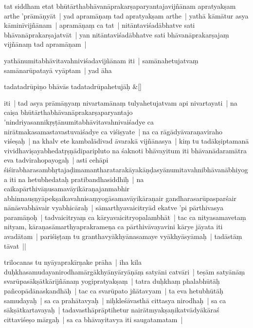 \documentclass[article,12pt,a4paper]{memoir}%
\newcommand{\name}[1]{#1}
\newcommand{\persName}[1]{#1}
\newcounter{parCount}
\begin{document}
	  
	  \pstart \leavevmode%
	\label{thakur75-13.23}tat siddham etat bhūtārthabhāvanāprakarṣaparyantajavijñānam apratyakṣam arthe 'prāmāṇyāt | yad apramāṇaṃ tad apratyakṣam arthe | yathā kāmātur asya kāminīvijñānam | apramāṇaṃ ca tat | nitāntaviśadābhatve sati bhāvanāprakarṣajatvāt | yan nitāntaviśadābhatve sati bhāvanāprakarṣajaṃ vijñānaṃ tad apramāṇam | 
	{}
	\pend%
      

	  
	  \pstart \leavevmode%
	\label{thakur75-14.1}yathānumitabhāvitavahniviśadavijñānam iti | samānahetujatvaṃ samānarūpatayā vyāptam | yad āha 
	{}
	\pend%
      
	    
	    \stanza[\smallbreak]
	  tadatadrūpiṇo bhāvās tadatadrūpahetujāḥ \&[\smallbreak]
	  
	  
	  

	  
	  \pstart \leavevmode%
	iti | tad asya prāmāṇyaṃ nivartamānaṃ tulyahetujatvam api nivartayati | na caiṣa bhūtārthabhāvanāprakarṣaparyantajo 'nindriyasannikṛṣṭānumitabhāvitavahnivaiśadye ca nirātmakasamastavastuvaiśadye ca viśiṣyate | na ca rāgādyāvaraṇaviraho viśeṣaḥ | na khalv ete kambalādivad āvarakā vijñānasya | kiṃ tu tadākṣiptamanā vividhaviṣayabhedatṛṣṇādiparipluto na śaknoti bhāvayitum iti bhāvanādaramātra eva tadvirahopayogaḥ | asti cehāpi śiśirabharasambhṛtajaḍimamantharatarakāyakāṇḍasyānumitavahnibhāvanābhiyoga iti na hetubhedataḥ pratibandhasiddhiḥ | na caikapārthivāṇusamavāyikāraṇajanmabhir abhinnauṣṇyāpekṣaikavahnisaṃyogāsamavāyikāraṇair gandharasarūpasparśair nānāsvabhāvair vyabhicāraḥ | sāmarthyavaicitryād ekatve 'pi pārthivasya paramāṇoḥ | tadvaicitryaṃ ca kāryavaicitryopalambhāt | tac ca nityasamavetaṃ nityam, kāraṇasāmarthyaprakrameṇa ca pārthivāvayavini kārye jāyata iti avadātam | pariśiṣṭaṃ tu granthavyākhyānasamaye vyākhyāsyāmaḥ | tadāstāṃ tāvat || 
	{}
	\pend%
      

	  
	  \pstart \leavevmode%
	\label{thakur75-14.16}\persName{trilocanas} tu \name{nyāyaprakīrṇake} prāha | iha kila duḥkhasamudayanirodhamārgākhyānyāryāṇāṃ satyāni catvāri | teṣām satyānāṃ svarūpasākṣātkārijñānaṃ yogipratyakṣaṃ | tatra duḥkhaṃ phalabhūtāḥ pañcopādānaskandhāḥ | tac ca svarūpato jñātavyam | ta eva hetubhūtāḥ samudayaḥ | sa ca prahātavyaḥ | niḥkleśāvasthā cittasya nirodhaḥ | sa ca sākṣātkartavayaḥ | tadavasthāprāptihetur nairātmyakṣaṇikatvādyākāraś cittaviśeṣo mārgaḥ | sa ca bhāvayitavya iti saugatamatam |
	{}
	\pend%
      
\end{document}

